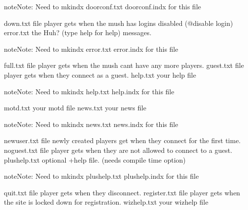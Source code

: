 \documentclass[letterpaper,10pt,english]{sphinxmanual}
\begin{document}
\begin{sphinxadmonition}{note}{Note:}
\sphinxAtStartPar
Need to mkindx doorconf.txt doorconf.indx for this file
\end{sphinxadmonition}

\sphinxAtStartPar
down.txt               \sphinxhyphen{} file player gets when the mush has logins disabled (@disable login)
error.txt              \sphinxhyphen{} the \textquotesingle{}Huh? (type help for help)\textquotesingle{} messages.

\begin{sphinxadmonition}{note}{Note:}
\sphinxAtStartPar
Need to mkindx error.txt error.indx for this file
\end{sphinxadmonition}

\sphinxAtStartPar
full.txt               \sphinxhyphen{} file player gets when the mush can\textquotesingle{}t have any more players.
guest.txt              \sphinxhyphen{} file player gets when they connect as a guest.
help.txt               \sphinxhyphen{} your help file

\begin{sphinxadmonition}{note}{Note:}
\sphinxAtStartPar
Need to mkindx help.txt help.indx for this file
\end{sphinxadmonition}

\sphinxAtStartPar
motd.txt               \sphinxhyphen{} your motd file
news.txt               \sphinxhyphen{} your news file

\begin{sphinxadmonition}{note}{Note:}
\sphinxAtStartPar
Need to mkindx news.txt news.indx for this file
\end{sphinxadmonition}

\sphinxAtStartPar
newuser.txt            \sphinxhyphen{} file newly created players get when they connect for the first time.
noguest.txt            \sphinxhyphen{} file player gets when they are not allowed to connect to a guest.
plushelp.txt           \sphinxhyphen{} optional +help file. (needs compile time option)

\begin{sphinxadmonition}{note}{Note:}
\sphinxAtStartPar
Need to mkindx plushelp.txt plushelp.indx for this file
\end{sphinxadmonition}

\sphinxAtStartPar
quit.txt               \sphinxhyphen{} file player gets when they disconnect.
register.txt           \sphinxhyphen{} file player gets when the site is locked down for registration.
wizhelp.txt            \sphinxhyphen{} your wizhelp file
\end{document}
